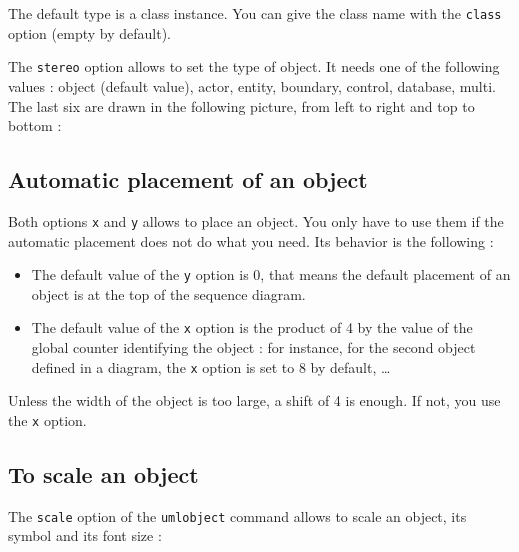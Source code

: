 \documentclass[a4paper,11pt]{report}
\newcommand{\inputTikZ}[1]{%
  }%
\newcommand{\inputTikZ}[1]{%
    \texttt{[image: fig/\#1.pdf]}%
  }%
\begin{document}
\medskip

The default type is a class instance. You can give the class name with the {\tt class} option (empty by default).

\medskip

The {\tt stereo} option allows to set the type of object. It needs one of the following values : object (default value), actor, entity, boundary, control, database, multi. The last six are drawn in the following picture, from left to right and top to bottom :

\medskip

\begin{minipage}{0.5\textwidth}

\end{minipage}
\begin{minipage}{0.5\textwidth}
\begin{center}
\inputTikZ{objectstereo}
\end{center}
\end{minipage}

\subsection{Automatic placement of an object}\label{ss.objpos}

Both options {\tt x} and {\tt y} allows to place an object. You only have to use them if the automatic placement does not do what you need. Its behavior is the following :

\begin{itemize}
\item The default value of the {\tt y} option is 0, that means the default placement of an object is at the top of the sequence diagram.
\item The default value of the {\tt x} option is the product of 4 by the value of the global counter identifying the object : for instance, for the second object defined in a diagram, the {\tt x} option is set to 8 by default, \ldots
\end{itemize}

Unless the width of the object is too large, a shift of 4 is enough. If not, you use the {\tt x} option.

\subsection{To scale an object}\label{ss.objdim}

The {\tt scale} option of the {\tt umlobject} command allows to scale an object, its symbol and its font size :
\end{document}
